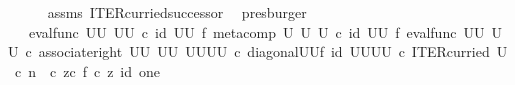 \begin{isabellebody}
\ \ \ \ \isamarkupfalse%
\ assms\ ITER{\isacharunderscore}{\kern0pt}curried{\isacharunderscore}{\kern0pt}successor\ \isamarkupfalse%
\ presburger\isanewline
\ \ \isamarkupfalse%
\ \isamarkupfalse%
\ {\isachardoublequoteopen}{\isachardot}{\kern0pt}{\isachardot}{\kern0pt}{\isachardot}{\kern0pt}\ {\isacharequal}{\kern0pt}\ {\isacharparenleft}{\kern0pt}eval{\isacharunderscore}{\kern0pt}func\ {\isacharparenleft}{\kern0pt}U\isactrlbsup U\isactrlesup {\isacharparenright}{\kern0pt}\ {\isacharparenleft}{\kern0pt}U\isactrlbsup U\isactrlesup {\isacharparenright}{\kern0pt}{\isacharparenright}{\kern0pt}\ {\isasymcirc}\isactrlsub c\ {\isacharparenleft}{\kern0pt}id\ {\isacharparenleft}{\kern0pt}U\isactrlbsup U\isactrlesup {\isacharparenright}{\kern0pt}\ {\isasymtimes}\isactrlsub f\ {\isacharparenleft}{\kern0pt}{\isacharparenleft}{\kern0pt}meta{\isacharunderscore}{\kern0pt}comp\ U\ U\ U\ {\isasymcirc}\isactrlsub c\ {\isacharparenleft}{\kern0pt}id\ {\isacharparenleft}{\kern0pt}U\isactrlbsup U\isactrlesup {\isacharparenright}{\kern0pt}\ {\isasymtimes}\isactrlsub f\ eval{\isacharunderscore}{\kern0pt}func\ {\isacharparenleft}{\kern0pt}U\isactrlbsup U\isactrlesup {\isacharparenright}{\kern0pt}\ {\isacharparenleft}{\kern0pt}U\isactrlbsup U\isactrlesup {\isacharparenright}{\kern0pt}{\isacharparenright}{\kern0pt}\ {\isasymcirc}\isactrlsub c\ {\isacharparenleft}{\kern0pt}associate{\isacharunderscore}{\kern0pt}right\ {\isacharparenleft}{\kern0pt}U\isactrlbsup U\isactrlesup {\isacharparenright}{\kern0pt}\ {\isacharparenleft}{\kern0pt}U\isactrlbsup U\isactrlesup {\isacharparenright}{\kern0pt}\ {\isacharparenleft}{\kern0pt}{\isacharparenleft}{\kern0pt}U\isactrlbsup U\isactrlesup {\isacharparenright}{\kern0pt}\isactrlbsup U\isactrlbsup U\isactrlesup \isactrlesup {\isacharparenright}{\kern0pt}{\isacharparenright}{\kern0pt}\ {\isasymcirc}\isactrlsub c\ {\isacharparenleft}{\kern0pt}diagonal{\isacharparenleft}{\kern0pt}U\isactrlbsup U\isactrlesup {\isacharparenright}{\kern0pt}{\isasymtimes}\isactrlsub f\ id\ {\isacharparenleft}{\kern0pt}{\isacharparenleft}{\kern0pt}U\isactrlbsup U\isactrlesup {\isacharparenright}{\kern0pt}\isactrlbsup U\isactrlbsup U\isactrlesup \isactrlesup {\isacharparenright}{\kern0pt}{\isacharparenright}{\kern0pt}{\isacharparenright}{\kern0pt}\isactrlsup {\isasymsharp}\ {\isasymcirc}\isactrlsub c\ ITER{\isacharunderscore}{\kern0pt}curried\ U{\isacharparenright}{\kern0pt}\ {\isasymcirc}\isactrlsub c\ {\isacharparenleft}{\kern0pt}n\ \ {\isasymcirc}\isactrlsub c\ z{\isacharparenright}{\kern0pt}{\isacharparenright}{\kern0pt}{\isasymcirc}\isactrlsub c\ {\isasymlangle}f\ {\isasymcirc}\isactrlsub c\ z{\isacharcomma}{\kern0pt}\ id\ one{\isasymrangle}{\isachardoublequoteclose}\isanewline

\end{isabellebody}
